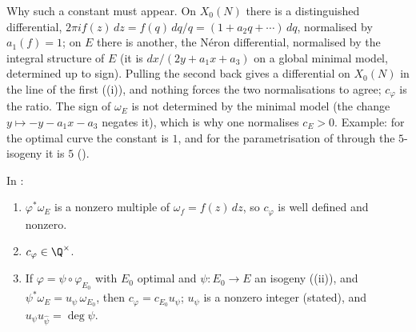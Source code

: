 Why such a constant must appear. On $X_0(N)$ there is a distinguished differential, $2\pi if(z)\,dz=f(q)\,dq/q=(1+a_2q+\cdots)\,dq$, normalised by $a_1(f)=1$; on $E$ there is another,
the N\'eron differential, normalised by the integral structure of $E$ (it is $dx/(2y+a_1x+a_3)$ on a global minimal model, determined up to sign). Pulling the second back gives a
differential on $X_0(N)$ in the line of the first ((i)), and nothing forces the two normalisations to agree; $c_\varphi$ is the ratio. The sign of
$\omega_E$ is not determined by the minimal model (the change $y\mapsto-y-a_1x-a_3$ negates it), which is why one normalises $c_E>0$. Example: for the optimal curve 
the constant is $1$, and for the parametrisation of  through the $5$-isogeny it is $5$ ().

\begin{proposition}\label{prop:moddeg:manin-rational}
In :
\begin{enumerate}[label=(\roman*)]
\item $\varphi^*\omega_E$ is a nonzero multiple of $\omega_f=f(z)\,dz$, so $c_\varphi$ is well defined and nonzero.
\item $c_\varphi\in\Q^\times$.
\item If $\varphi=\psi\circ\varphi_{E_0}$ with $E_0$ optimal and $\psi\colon E_0\to E$ an isogeny ((ii)), and $\psi^*\omega_E=u_\psi\,\omega_{E_0}$, then $c_\varphi=c_{E_0}u_\psi$;
$u_\psi$ is a nonzero integer (stated), and $u_\psi u_{\hat\psi}=\deg\psi$.
\end{enumerate}
\end{proposition}

